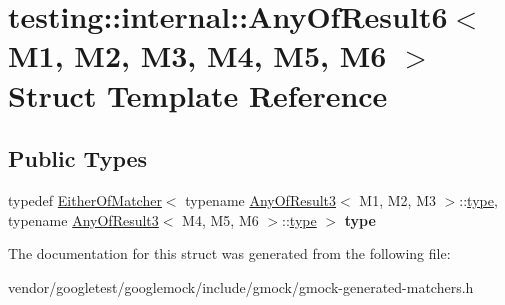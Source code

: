 \hypertarget{structtesting_1_1internal_1_1AnyOfResult6}{}\section{testing\+:\+:internal\+:\+:Any\+Of\+Result6$<$ M1, M2, M3, M4, M5, M6 $>$ Struct Template Reference}
\label{structtesting_1_1internal_1_1AnyOfResult6}
\subsection*{Public Types}
\begin{DoxyCompactItemize}
\item 
typedef \hyperlink{classtesting_1_1internal_1_1EitherOfMatcher}{Either\+Of\+Matcher}$<$ typename \hyperlink{structtesting_1_1internal_1_1AnyOfResult3}{Any\+Of\+Result3}$<$ M1, M2, M3 $>$\+::\hyperlink{classtesting_1_1internal_1_1EitherOfMatcher}{type}, typename \hyperlink{structtesting_1_1internal_1_1AnyOfResult3}{Any\+Of\+Result3}$<$ M4, M5, M6 $>$\+::\hyperlink{classtesting_1_1internal_1_1EitherOfMatcher}{type} $>$ {\bfseries type}\hypertarget{structtesting_1_1internal_1_1AnyOfResult6_a15837eb05d9ac5a76c20d344a4988dd1}{}\label{structtesting_1_1internal_1_1AnyOfResult6_a15837eb05d9ac5a76c20d344a4988dd1}

\end{DoxyCompactItemize}


The documentation for this struct was generated from the following file\+:\begin{DoxyCompactItemize}
\item 
vendor/googletest/googlemock/include/gmock/gmock-\/generated-\/matchers.\+h\end{DoxyCompactItemize}
